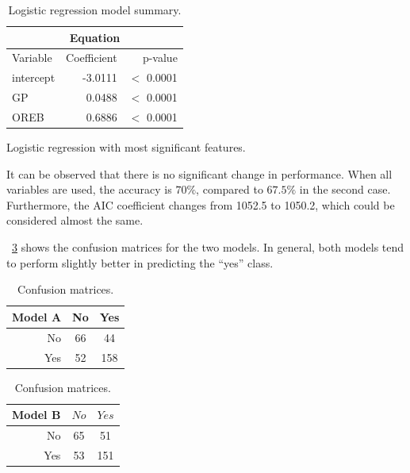 \begin{table}[H]
	\hfill
	\begin{subtable}[h]{0.3\textwidth}
		\centering
		\begin{tabular}{|| l | r | r ||} 
			\hline
			\multicolumn{3}{|c|}{Equation} \\
			\hline
			Variable & Coefficient & p-value \\
			\hline
			intercept & -3.0111 & $<$ 0.0001 \\
			GP & 0.0488 & $<$ 0.0001 \\
			OREB & 0.6886 & $<$ 0.0001 \\	
			\hline
		\end{tabular}
		\caption{Logistic regression with most significant features.}
		\label{table:LRImpSum}
	\end{subtable}
	\caption{Logistic regression model summary.}
	\label{table:LRSum}
\end{table}

It can be observed that there is no significant change in performance. When all variables are used, the accuracy is $70\%$, compared to $67.5\%$ in the second case. Furthermore, the AIC coefficient changes from 1052.5 to 1050.2, which could be considered almost the same. 

\Tab~\ref{table:ConfMat} shows the confusion matrices for the two models. In general, both models tend to perform slightly better in predicting the ``yes'' class.

\begin{table}[H]
	\begin{subtable}[h]{0.4\textwidth}
		\centering
		\begin{tabular}{|| cr | cc ||}    
			\hline
			\multicolumn{2}{|c|}{Model A} 
			& No & Yes \\
			\hline
			& No & 66 & 44 \\
			& Yes & 52 & 158 \\
			\hline
		\end{tabular}
		\caption{}
		\label{table:ConfMatModA}
	\end{subtable}
	\hfill
	\begin{subtable}[h]{0.4\textwidth}
		\centering
		\begin{tabular}{|| cr | cc ||}    
			\hline
			\multicolumn{2}{|c|}{Model B} 
			& $No$ & $Yes$ \\
			\hline
			& No & 65 & 51 \\
			& Yes & 53 & 151 \\
			\hline
		\end{tabular}
		\caption{}
		\label{table:ConfMatModA}
	\end{subtable}
	\caption{Confusion matrices.}
	\label{table:ConfMat}
\end{table}

